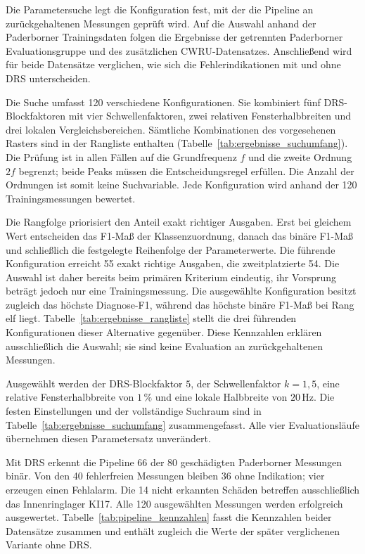 Die Parametersuche legt die Konfiguration fest, mit der die Pipeline an
zurückgehaltenen Messungen geprüft wird. Auf die Auswahl anhand der
Paderborner Trainingsdaten folgen die Ergebnisse der getrennten Paderborner
Evaluationsgruppe und des zusätzlichen CWRU-Datensatzes. Anschließend wird
für beide Datensätze verglichen, wie sich die Fehlerindikationen mit und
ohne DRS unterscheiden.


Die Suche umfasst 120 verschiedene Konfigurationen. Sie kombiniert fünf
DRS-Blockfaktoren mit vier Schwellenfaktoren, zwei relativen
Fensterhalbbreiten und drei lokalen Vergleichsbereichen. Sämtliche
Kombinationen des vorgesehenen Rasters sind in der Rangliste enthalten
(Tabelle~\ref{tab:ergebnisse_suchumfang}). Die Prüfung ist in allen Fällen
auf die Grundfrequenz $f$ und die zweite Ordnung $2f$ begrenzt; beide Peaks
müssen die Entscheidungsregel erfüllen. Die Anzahl der Ordnungen ist somit
keine Suchvariable. Jede Konfiguration wird anhand der 120
Trainingsmessungen bewertet.

Die Rangfolge priorisiert den Anteil exakt richtiger Ausgaben. Erst bei
gleichem Wert entscheiden das F1-Maß der Klassenzuordnung, danach das binäre
F1-Maß und schließlich die festgelegte Reihenfolge der Parameterwerte.
Die führende Konfiguration erreicht 55 exakt richtige Ausgaben,
die zweitplatzierte 54. Die Auswahl ist daher bereits beim primären
Kriterium eindeutig, ihr Vorsprung beträgt jedoch nur eine Trainingsmessung.
Die ausgewählte Konfiguration besitzt zugleich das höchste Diagnose-F1,
während das höchste binäre F1-Maß bei Rang elf liegt.
Tabelle~\ref{tab:ergebnisse_rangliste} stellt die drei führenden
Konfigurationen dieser Alternative gegenüber. Diese Kennzahlen erklären
ausschließlich die Auswahl; sie sind keine Evaluation an zurückgehaltenen
Messungen.

Ausgewählt werden der DRS-Blockfaktor $5$, der Schwellenfaktor $k=1{,}5$,
eine relative Fensterhalbbreite von $1\,\%$ und eine lokale Halbbreite von
$20\,\mathrm{Hz}$. Die festen Einstellungen und der vollständige Suchraum
sind in Tabelle~\ref{tab:ergebnisse_suchumfang} zusammengefasst.
Alle vier Evaluationsläufe übernehmen diesen Parametersatz unverändert.


Mit DRS erkennt die Pipeline 66 der 80 geschädigten Paderborner Messungen
binär. Von den 40 fehlerfreien Messungen bleiben 36 ohne Indikation;
vier erzeugen einen Fehlalarm. Die 14 nicht erkannten Schäden betreffen
ausschließlich das Innenringlager KI17. Alle 120 ausgewählten Messungen
werden erfolgreich ausgewertet. Tabelle~\ref{tab:pipeline_kennzahlen}
fasst die Kennzahlen beider Datensätze zusammen und enthält zugleich die
Werte der später verglichenen Variante ohne DRS.

